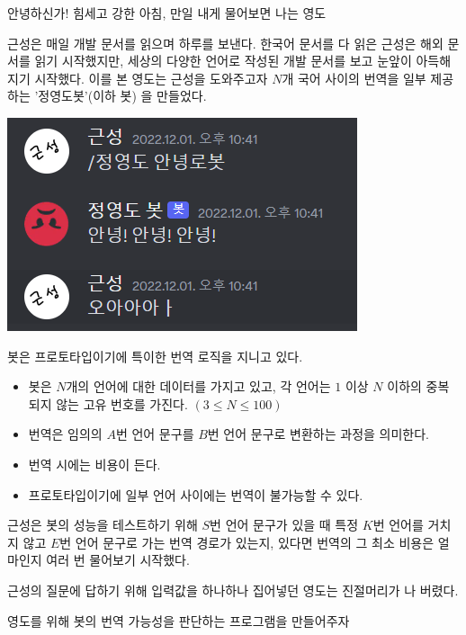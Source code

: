 안녕하신가! 힘세고 강한 아침, 만일 내게 물어보면 
나는 영도

근성은 매일 개발 문서를 읽으며 하루를 보낸다.
한국어 문서를 다 읽은 근성은 해외 문서를 읽기 시작했지만, 세상의 다양한 언어로 작성된 개발 문서를 보고 눈앞이 아득해지기 시작했다.
이를 본 영도는 근성을 도와주고자 $N$개 국어 사이의 번역을 일부 제공하는 '정영도봇'(이하 봇) 을 만들었다.

\begin{center}
\includegraphics[scale=1]{1.png}
\end{center}

봇은 프로토타입이기에 특이한 번역 로직을 지니고 있다.

\begin{itemize}
 \item 봇은 $N$개의 언어에 대한 데이터를 가지고 있고, 각 언어는 $1$ 이상 $N$ 이하의 중복되지 않는 고유 번호를 가진다. $( 3 \le N \le 100 )$
 \item 번역은 임의의 $A$번 언어 문구를 $B$번 언어 문구로 변환하는 과정을 의미한다.
 \item 번역 시에는 비용이 든다.
 \item 프로토타입이기에 일부 언어 사이에는 번역이 불가능할 수 있다.
 

\end{itemize}
근성은 봇의 성능을 테스트하기 위해 $S$번 언어 문구가 있을 때 특정 $K$번 언어를 거치지 않고 $E$번 언어 문구로 가는 번역 경로가 있는지, 있다면 번역의 그 최소 비용은 얼마인지 여러 번 물어보기 시작했다.

근성의 질문에 답하기 위해 입력값을 하나하나 집어넣던 영도는 진절머리가 나 버렸다.

영도를 위해 봇의 번역 가능성을 판단하는 프로그램을 만들어주자
